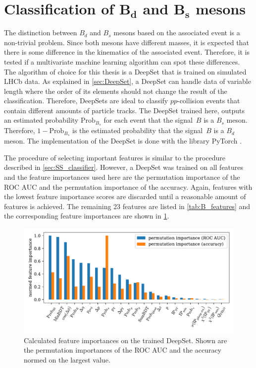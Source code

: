 \section[Classification of \texorpdfstring{$B_d$ and $B_s$}{Bd and Bs} mesons]{Classification of \texorpdfstring{$\symbf{B_d}$ and $\symbf{B_s}$}{Bd and Bs} mesons}

The distinction between $B_d$ and $B_s$ mesons based on the associated event is a non-trivial problem.
Since both mesons have different masses, it is expected that there is some difference in the kinematics of the associated event.
Therefore, it is tested if a multivariate machine learning algorithm can spot these differences.
The algorithm of choice for this thesis is a DeepSet that is trained on simulated LHCb data.
As explained in \cref{sec:DeepSet}, a DeepSet can handle data of variable length where the order of its elements should not change the result of the classification.
Therefore, DeepSets are ideal to classify $pp$-collision events that contain different amounts of particle tracks.
The DeepSet trained here, outputs an estimated probability $\text{Prob}_{B_s}$ for each event that the signal~$B$ is a $B_s$ meson.
Therefore, $1-\text{Prob}_{B_s}$ is the estimated probability that the signal~$B$ is a $B_d$ meson.
The implementation of the DeepSet is done with the library PyTorch \cite{pytorch}.

The procedure of selecting important features is similar to the procedure described in \cref{sec:SS_classifier}.
However, a DeepSet was trained on all features and the feature importances used here are the permutation importance of the ROC AUC and the permutation importance of the accuracy.
Again, features with the lowest feature importance scores are discarded until a reasonable amount of features is achieved.
The remaining 23 features are listed in \cref{tab:B_features} and the corresponding feature importances are shown in \cref{fig:B_importances}.

\begin{figure}
    \centering
    \includegraphics[width=\textwidth]{images/B_feature_importances.pdf}
    \caption{Calculated feature importances on the trained DeepSet. Shown are the permutation importances of the ROC AUC and the accuracy normed on the largest value.}
    \label{fig:B_importances}
\end{figure}


